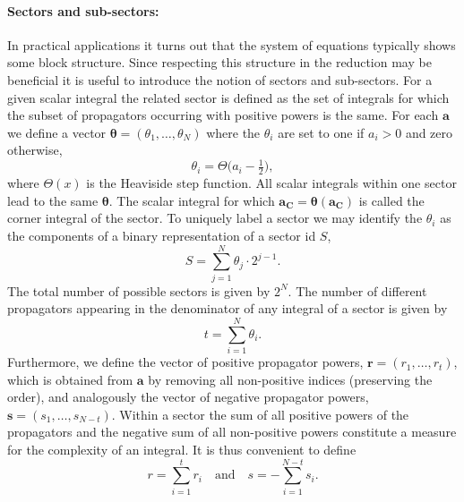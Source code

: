 \documentclass[a4paper,12pt]{scrartcl}
\newcommand*{\bm}{\boldsymbol}
\begin{document}
\paragraph{Sectors and sub-sectors:} In practical applications it turns
out that the system of equations typically shows some block structure.
Since respecting this structure in the reduction may be beneficial it
is useful to introduce the notion of sectors and sub-sectors.  For a
given scalar integral the related sector is defined as the set of
integrals for which the subset of propagators occurring with positive
powers is the same. For each $\bm{a}$ we define a vector $\bm{\theta}
= (\theta_1,\ldots,\theta_N)$ where the $\theta_i$ are set to one if
$a_i>0$ and zero otherwise,
\begin{equation}
  \theta_i = \Theta\big(a_i-\tfrac{1}{2}\big),
\end{equation}
where $\Theta(x)$ is the Heaviside step function.
All scalar integrals within one sector lead to the same
$\bm{\theta}$. The scalar integral for which $\bm{a_C} =
\bm{\theta}(\bm{a_C})$ is called the corner integral of the sector.
To uniquely label a sector we may identify the $\theta_i$ as the
components of a binary representation of a sector id $S$,
\begin{equation}
  \label{eq:sectornumber}
  S = \sum_{j=1}^N  \theta_j \cdot 2^{j-1}.
\end{equation}
The total number of possible sectors is given by $2^N$. The number of different
propagators appearing in the denominator of any integral of a sector
is given by
\begin{equation}
  \label{eq:t-definition}
  t = \sum_{i=1}^N \theta_i.
\end{equation}
Furthermore, we define the vector of positive propagator powers,
$\bm{r}=(r_{1},\dots,r_{t})$, which is obtained from $\bm{a}$ by removing
all non-positive indices (preserving the order), and analogously the vector
of negative propagator powers, $\bm{s}=(s_{1},\dots,s_{N-t})$.
Within a sector the sum of all positive powers of the propagators and the
negative sum of all non-positive powers constitute a measure for the complexity
of an integral. It is thus convenient to define
\begin{equation}
  \label{eq:rs-value}
  r = \sum_{i=1}^{t} r_i\quad\text{and}\quad s = -\sum_{i=1}^{N-t} s_i.
\end{equation}
\end{document}

